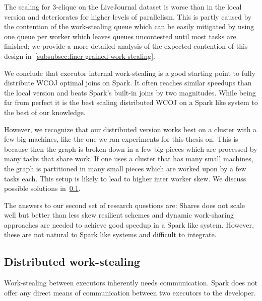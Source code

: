 The scaling for 3-clique on the LiveJournal dataset is worse than in the local version and
deteriorates for higher levels of parallelism.
This is partly caused by the contention of the work-stealing queue which can be easily mitigated
by using one queue per worker which leaves queues uncontested until most tasks are finished;
we provide a more detailed analysis of the expected contention of this design in~\cref{subsubsec:finer-grained-work-stealing}.

We conclude that executor internal work-stealing is a good starting point to fully distribute
\textsc{WCOJ} optimal joins on Spark.
It often reaches similar speedups than the local version and beats Spark's built-in joins
by two magnitudes.
While being far from perfect it is the best scaling distributed \textsc{WCOJ} on a Spark
like system to the best of our knowledge.

However, we recognize that our distributed version works best on a cluster with a few
big machines, like the one we ran experiments for this thesis on.
This is because then the graph is broken down in a few big pieces which are processed by
many tasks that share work.
If one uses a cluster that has many small machines, the graph is partitioned in many small pieces
which are worked upon by a few tasks each.
This setup is likely to lead to higher inter worker skew.
We discuss possible solutions in~\cref{subsubsec:cluster-mode}.

The answers to our second set of research questions are: Shares does not scale well but
better than less skew resilient schemes and dynamic work-sharing approaches are needed to
achieve good speedup in a Spark like system.
However, these are not natural to Spark like systems and difficult to integrate.

\subsection{Distributed work-stealing} \label{subsubsec:cluster-mode}

Work-stealing between executors inherently needs communication.
Spark does not offer any direct means of communication between two executors to the developer.

